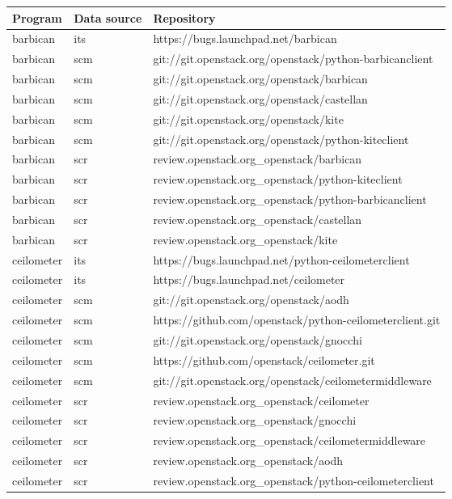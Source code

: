 \begin{center}                                                                       
\begin{longtable}{|p{4cm}|p{1cm}|p{10cm}|}
\hline
Program & Data source & Repository \\
\hline

barbican&its&https://bugs.launchpad.net/barbican\\ 
barbican&scm&git://git.openstack.org/openstack/python-barbicanclient\\ 
barbican&scm&git://git.openstack.org/openstack/barbican\\ 
barbican&scm&git://git.openstack.org/openstack/castellan\\ 
barbican&scm&git://git.openstack.org/openstack/kite\\ 
barbican&scm&git://git.openstack.org/openstack/python-kiteclient\\ 
barbican&scr&review.openstack.org\_openstack/barbican\\ 
barbican&scr&review.openstack.org\_openstack/python-kiteclient\\ 
barbican&scr&review.openstack.org\_openstack/python-barbicanclient\\ 
barbican&scr&review.openstack.org\_openstack/castellan\\ 
barbican&scr&review.openstack.org\_openstack/kite\\ 
ceilometer&its&https://bugs.launchpad.net/python-ceilometerclient\\ 
ceilometer&its&https://bugs.launchpad.net/ceilometer\\ 
ceilometer&scm&git://git.openstack.org/openstack/aodh\\ 
ceilometer&scm&https://github.com/openstack/python-ceilometerclient.git\\ 
ceilometer&scm&git://git.openstack.org/openstack/gnocchi\\ 
ceilometer&scm&https://github.com/openstack/ceilometer.git\\ 
ceilometer&scm&git://git.openstack.org/openstack/ceilometermiddleware\\ 
ceilometer&scr&review.openstack.org\_openstack/ceilometer\\ 
ceilometer&scr&review.openstack.org\_openstack/gnocchi\\ 
ceilometer&scr&review.openstack.org\_openstack/ceilometermiddleware\\ 
ceilometer&scr&review.openstack.org\_openstack/aodh\\ 
ceilometer&scr&review.openstack.org\_openstack/python-ceilometerclient\\ 

\end{longtable}
\end{center}
